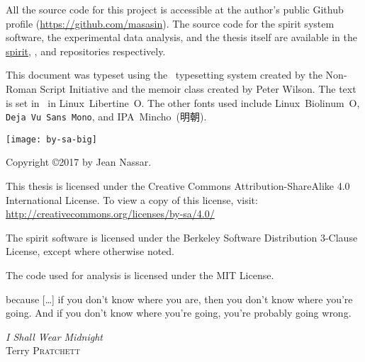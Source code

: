 \begin{titlingpage}
\maketitle
\thispagestyle{empty}

\clearpage
\null\vfill
\noindent \emph{\mytitle}

\noindent \emph{\mytitlejp}
\vspace{1em}

\noindent All the source code for this project is accessible at the author's public Github profile (\url{https://github.com/masasin}).
The source code for the \acrshort{spirit} system software, the experimental data analysis, and the thesis itself are available in the \href{https://github.com/masasin/spirit}{\textsf{spirit}}, \href{https://github.com/masasin/spirit_analysis}{\textsf{}}, and \href{https://github.com/masasin/spirit_thesis}{\textsf{}} repositories respectively.
\vspace{1em}

\noindent This document was typeset using the \XeTeX\ typesetting system created by the Non-Roman Script Initiative and the \textsf{memoir} class created by Peter Wilson.
The text is set in \mytextsize\ in Linux~Libertine~O.
The other fonts used include \textsf{Linux~Biolinum~O}, \texttt{Deja~Vu~Sans~Mono}, and IPA~Mincho~(明朝).
\vspace{1em}

\noindent \texttt{[image: by-sa-big]}

\noindent
Copyright \copyright 2017 by Jean Nassar.

\noindent This thesis is licensed under the Creative Commons Attribution-ShareAlike 4.0 International License.
To view a copy of this license, visit:\\
\url{http://creativecommons.org/licenses/by-sa/4.0/}

\noindent The \acrshort{spirit} software is licensed under the Berkeley Software Distribution 3-Clause License, except where otherwise noted.

\noindent The code used for analysis is licensed under the MIT License.
\end{titlingpage}


\thispagestyle{empty}
\setlength{\epigraphwidth}{0.7\textwidth}
\null\vfill
\epigraph{
  because [\ldots] if you don't know where you are, then you don't know where you're going.
  And if you don't know where you're going, you're probably going wrong.}
  {\emph{I Shall Wear Midnight}\\
   Terry \textsc{Pratchett}}
\vfill\vfill\null

